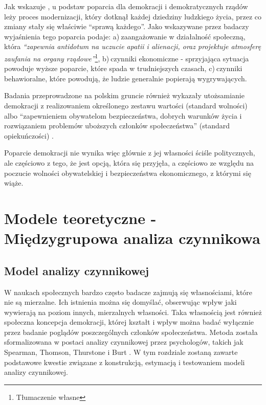 \documentclass[12pt]{article}
\begin{document}
Jak wskazuje \citet{Campbell}, u podstaw poparcia dla demokracji i demokratycznych rządów leży proces modernizacji, który dotknął każdej dziedziny ludzkiego życia, przez co zmiany stały się właściwie ``sprawą każdego''. Jako wskazywane przez badaczy wyjaśnienia tego poparcia podaje: a)\(~\)zaangażowanie w działalność społeczną, która \emph{``zapewnia antidotum na uczucie apatii i alienacji, oraz projektuje atmosferę zaufania na organy rządowe''}\footnote{Tłumaczenie własne}, b)\(~\)czynniki ekonomiczne - sprzyjająca sytuacja powoduje wyższe poparcie, które spada w trudniejszych czasach, c)\(~\)czynniki behawioralne, które powodują, że ludzie generalnie popierają wygrywających.

Badania przeprowadzone na polskim gruncie również wykazały utożsamianie demokracji z realizowaniem określonego zestawu wartości (standard wolności) albo ``zapewnieniem obywatelom bezpieczeństwa, dobrych warunków życia i rozwiązaniem problemów uboższych członków społeczeństwa'' (standard opiekuńczości) \citep{JaskoKoss}.

Poparcie demokracji nie wynika więc głównie z jej własności ściśle politycznych, ale częściowo z tego, że jest opcją, która się przyjęła, a częściowo ze względu na poczucie wolności obywatelskiej i bezpieczeństwa ekonomicznego, z którymi się wiąże.

\newpage

\hypertarget{modele-teoretyczne---miux119dzygrupowa-analiza-czynnikowa}{%
\section{Modele teoretyczne - Międzygrupowa analiza czynnikowa}\label{modele-teoretyczne---miux119dzygrupowa-analiza-czynnikowa}}

\hypertarget{model-analizy-czynnikowej}{%
\subsection{Model analizy czynnikowej}\label{model-analizy-czynnikowej}}

W naukach społecznych bardzo często badacze zajmują się własnościami, które nie są mierzalne. Ich istnienia można się domyślać, obserwując wpływ jaki wywierają na poziom innych, mierzalnych własności. Taka własnością jest również społeczna koncepcja demokracji, której kształt i wpływ można badać wyłącznie przez badanie poglądów poszczególnych członków społeczeństwa. Metoda została sformalizowana w postaci analizy czynnikowej przez psychologów, takich jak Spearman, Thomson, Thurstone i Burt \citep{Everitt}. W tym rozdziale zostaną zawarte podstawowe kwestie związane z konstrukcją, estymacją i testowaniem modeli analizy czynnikowej.
\end{document}
